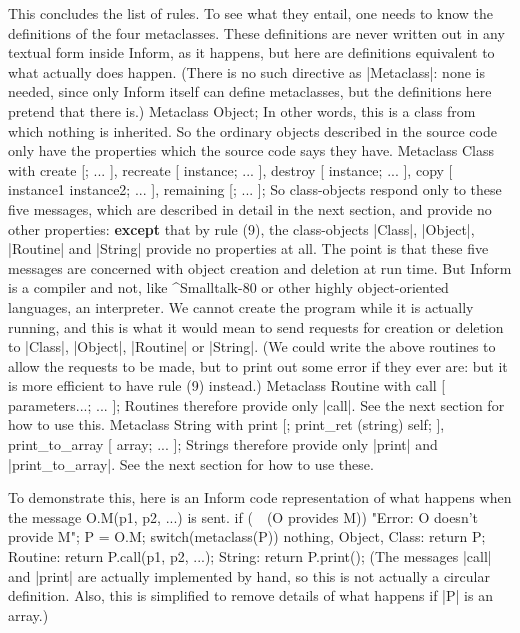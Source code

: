 \bigskip\noindent
This concludes the list of rules.  To see what they entail, one needs to
know the definitions of the four metaclasses.  These definitions are never
written out in any textual form inside Inform, as it happens, but here are
definitions equivalent to what actually does happen.  (There is no such
directive as |Metaclass|: none is needed, since only Inform itself can
define metaclasses, but the definitions here pretend that there is.)
\beginstt
    Metaclass Object;
\endtt
In other words, this is a class from which nothing is inherited.  So the
ordinary objects described in the source code only have the properties which
the source code says they have.
\beginstt
    Metaclass Class
    with create    [; ... ],
         recreate  [ instance; ... ],
         destroy   [ instance; ... ],
         copy      [ instance1 instance2; ... ],
         remaining [; ... ];
\endtt
So class-objects respond only to these five messages, which are described in
detail in the next section, and provide no other properties: {\bf except} that
by rule (9), the class-objects |Class|, |Object|, |Routine| and |String|
provide no properties at all.  The point is that these five messages are
concerned with object creation and deletion at run time.  But Inform is a
compiler and not, like ^{Smalltalk-80} or other highly object-oriented
languages, an interpreter.  We cannot create the program while it is actually
running, and this is what it would mean to send requests for creation or
deletion to |Class|, |Object|, |Routine| or |String|.  (We could write the
above routines to allow the requests to be made, but to print out some error
if they ever are: but it is more efficient to have rule (9) instead.)
\beginstt
    Metaclass Routine
    with call      [ parameters...; ... ];
\endtt
Routines therefore provide only |call|.  See the next section for how to use
this.
\beginstt
    Metaclass String
    with print     [; print_ret (string) self; ],
         print_to_array [ array; ... ];
\endtt
Strings therefore provide only |print| and |print_to_array|.  See the next
section for how to use these.
    
\bigskip\noindent
To demonstrate this, here is an Inform code representation of what happens
when the message
\beginstt
     O.M(p1, p2, ...)
\endtt     
is sent.
\beginstt
     if (~~(O provides M)) "Error: O doesn't provide M";
     P = O.M;
     switch(metaclass(P))
     {   nothing, Object, Class: return P;
         Routine:                return P.call(p1, p2, ...);
         String:                 return P.print();
     }
\endtt
(The messages |call| and |print| are actually implemented by hand, so this
is not actually a circular definition.  Also, this is simplified to remove
details of what happens if |P| is an array.)
\tenpoint

